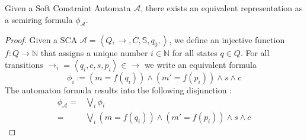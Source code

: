 
\begin{theorem}
	Given a Soft Constraint Automata $\mathcal{A}$, there exists an equivalent representation as a semiring formula $\phi_{\mathcal{A}}$.
\end{theorem}
\begin{proof}
	Given a SCA $\mathcal{A} = \left\langle Q, \rightarrow, C, \mathbb{S}, q_{0}, \right\rangle$, we define an injective function $f : Q \rightarrow \mathbb{N}$ that assigns a unique number $i \in \mathbb{N}$ for all states $q \in Q$. For all transitions $\rightarrow_i = \left\langle q_i, c, s, p_i \right\rangle \in \rightarrow $ we write an equivalent formula $$\phi_i := (m = f(q_i)) \land (m'= f(p_i)) \land s \land c$$
	The automaton formula results into the following disjunction :
	\begin{align*}
	\phi_{\mathcal{A}} 	= 	& 	\bigvee_i \phi_i \\
						=	&	\bigvee_i (m = f(q_i)) \land (m'= f(p_i)) \land s \land c 
	\end{align*}
\end{proof}

